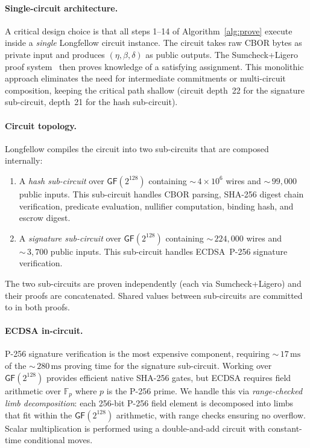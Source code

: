 \paragraph{Single-circuit architecture.}
A critical design choice is that all steps 1--14 of Algorithm~\ref{alg:prove} execute inside a \emph{single} Longfellow circuit instance.  The circuit takes raw CBOR bytes as private input and produces $({\eta}, {\beta}, {\delta})$ as public outputs.  The Sumcheck+Ligero proof system~\cite{sumcheck,ligero} then proves knowledge of a satisfying assignment.  This monolithic approach eliminates the need for intermediate commitments or multi-circuit composition, keeping the critical path shallow (circuit depth~22 for the signature sub-circuit, depth~21 for the hash sub-circuit).

\paragraph{Circuit topology.}
Longfellow compiles the circuit into two sub-circuits that are composed internally:
\begin{enumerate}
  \item A \emph{hash sub-circuit} over $\mathsf{GF}(2^{128})$ containing ${\sim}\,4 \times 10^6$ wires and ${\sim}\,99{,}000$ public inputs.  This sub-circuit handles CBOR parsing, SHA-256 digest chain verification, predicate evaluation, nullifier computation, binding hash, and escrow digest.
  \item A \emph{signature sub-circuit} over $\mathsf{GF}(2^{128})$ containing ${\sim}\,224{,}000$ wires and ${\sim}\,3{,}700$ public inputs.  This sub-circuit handles ECDSA~P-256 signature verification.
\end{enumerate}
The two sub-circuits are proven independently (each via Sumcheck+Ligero) and their proofs are concatenated.  Shared values between sub-circuits are committed to in both proofs.

\paragraph{ECDSA in-circuit.}
P-256 signature verification is the most expensive component, requiring ${\sim}\,17\,\text{ms}$ of the ${\sim}\,280\,\text{ms}$ proving time for the signature sub-circuit.  Working over $\mathsf{GF}(2^{128})$ provides efficient native SHA-256 gates, but ECDSA requires field arithmetic over $\mathbb{F}_p$ where $p$ is the P-256 prime.  We handle this via \emph{range-checked limb decomposition}: each 256-bit P-256 field element is decomposed into limbs that fit within the $\mathsf{GF}(2^{128})$ arithmetic, with range checks ensuring no overflow.  Scalar multiplication is performed using a double-and-add circuit with constant-time conditional moves.

